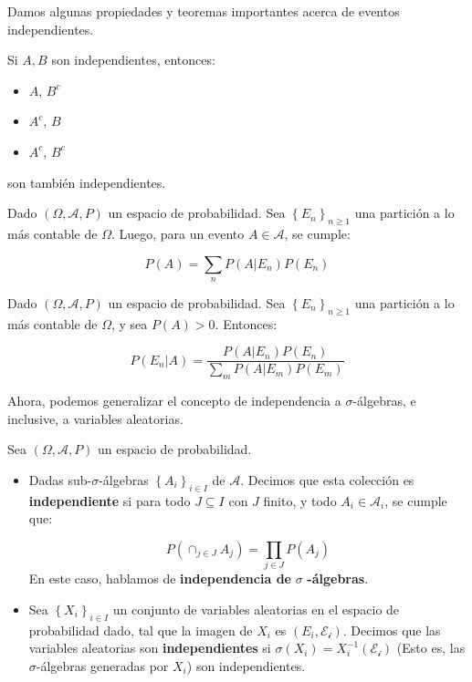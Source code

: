 Damos algunas propiedades y teoremas importantes acerca de eventos independientes.

\begin{theorem}
	Si $A, B$ son independientes, entonces:

	\begin{itemize}
		\item $A$, $B^c$
		\item $A^c$, $B$
		\item $A^c$, $B^c$	
	\end{itemize}

	son también independientes.

\end{theorem}


\begin{theorem}
	Dado $(\Omega, \mathcal{A}, P)$ un espacio de probabilidad. Sea $\left\{ E_n \right\}_{n \geq 1}$ una partición a lo más contable de $\Omega$. Luego, para un evento $A \in \mathcal{A}$, se cumple:

	\[
		P(A) = \sum_{n} P(A \vert E_n) P(E_n)
	\]

\end{theorem}

\begin{theorem}
	Dado $(\Omega, \mathcal{A}, P)$ un espacio de probabilidad. Sea $\left\{ E_n \right\}_{n \geq 1}$ una partición a lo más contable de $\Omega$, y sea $P(A) > 0$. Entonces:

	\[
		P(E_n \vert A) = \frac{ P(A \vert E_n) P(E_n) }{\sum_m P(A \vert E_m)P(E_m)}
	\]

\end{theorem}

Ahora, podemos generalizar el concepto de independencia a $\sigma$-álgebras, e inclusive, a variables aleatorias.

\begin{boxDef}
	Sea $(\Omega, \mathcal{A}, P)$ un espacio de probabilidad.
	\begin{itemize}
		\item Dadas sub-$\sigma$-álgebras $\left\{ A_i \right\}_{i \in I}$ de $\mathcal{A}$. Decimos que esta colección es \textbf{independiente} si para todo $J \subseteq I$ con $J$ finito, y todo $A_i \in \mathcal{A}_i$, se cumple que:

		\[
			P\left( \cap_{j \in J} A_j \right) = \prod_{j \in J} P(A_j)	
		\]
		En este caso, hablamos de \textbf{independencia de } $\sigma$ \textbf{-álgebras}. 

		\item Sea $\left\{ X_i \right\}_{i \in I}$ un conjunto de variables aleatorias en el espacio de probabilidad dado, tal que la imagen de $X_i$ es $(E_i, \mathcal{E_i})$. Decimos que las variables aleatorias son \textbf{independientes} si $\sigma (X_i) = X_i^{-1}(\mathcal{E_i})$ (Esto es, las $\sigma$-álgebras generadas por $X_i$) son independientes.
	\end{itemize}

\end{boxDef}

